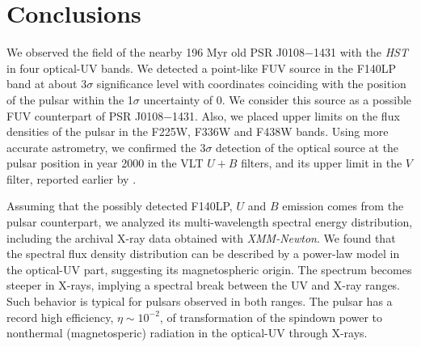 \documentclass[pdftex,twocolumn]{aastex62}
\newcommand{\gp}[1]{{\color{blue} #1}}
\begin{document}



\section{Conclusions}

We observed the field of the nearby  
196 Myr 
old PSR J0108$-$1431 with the {\sl HST} in four optical-UV bands. 
We detected a point-like FUV source in the 
F140LP band at about 3$\sigma$ significance
level with coordinates coinciding with 
the position of the pulsar within the 1$\sigma$ uncertainty
of 0. 
We consider this source as a possible FUV counterpart of 
PSR J0108$-$1431. Also, we placed upper limits on 
the flux densities of the pulsar in the F225W, 
F336W and F438W bands. 
Using more accurate astrometry, we confirmed the 
$3\sigma$ detection of the optical source at the pulsar position in year 2000 in the VLT {\bf $U+B$} filters, 
 and its upper limit in the $V$ filter,
reported 
earlier by \citet{Mignani2008}.    

Assuming that the possibly detected F140LP, $U$ and $B$ emission comes from the pulsar counterpart,
we analyzed its 
multi-wavelength 
spectral energy distribution,
 including the 
archival X-ray data obtained with 
\textit{XMM-Newton}. We found that
the spectral flux density distribution can be described by a %
power-law model in the optical-UV part, suggesting its magnetospheric origin.
The spectrum becomes steeper in X-rays, implying %
a spectral break between the UV and X-ray ranges. 
Such 
behavior is typical for pulsars observed in both ranges. 
The pulsar has a record high efficiency, $\eta\sim 10^{-2}$, of 
transformation of the 
spindown power to nonthermal (magnetosperic) radiation 
in the optical-UV through X-rays.
\end{document}
